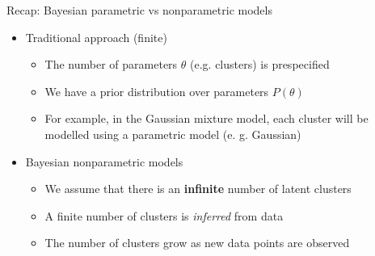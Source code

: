 \documentclass[handout]{beamer}
\begin{document}
\begin{frame}{Recap: Bayesian parametric vs nonparametric models}
    \begin{itemize}
        \item Traditional approach (finite)
           \begin{itemize}
               \item The number of parameters $\theta$ (e.g. clusters) is prespecified
               \item We have a prior distribution over parameters $P(\theta)$
               \item For example, in the Gaussian mixture model, each cluster will be modelled
                   using a parametric model (e. g. Gaussian)
           \end{itemize}
        \item Bayesian nonparametric models
           \begin{itemize}
               \item We assume that there is an \textbf{infinite} number of latent clusters
               \item A finite number of clusters is \textit{inferred} from data
               \item The number of clusters grow as new data points are observed
           \end{itemize}
    \end{itemize}
\end{frame}


\end{document}
